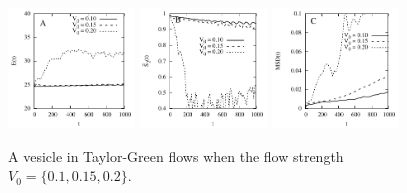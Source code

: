 \documentclass[aps,prl,preprint,groupedaddress]{revtex4-2}
\begin{document}
\begin{figure}
  \begin{center}
  \includegraphics[width=0.3\textwidth]{VTG_E.pdf}
   \includegraphics[width=0.3\textwidth]{VTG_LOP.pdf}
    \includegraphics[width=0.3\textwidth]{VTG_MSD.pdf}
  \end{center}
\caption{A vesicle in Taylor-Green flows when the flow strength $V_0=\{0.1, 0.15, 0.2\}$. }
\end{figure}
\end{document}
